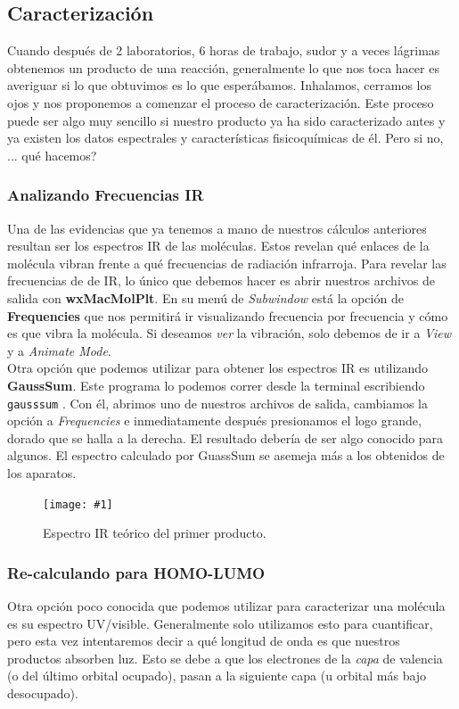 \documentclass[10pt,letterpaper]{article}
\newcommand{\inlinecode}[1]{
\colorbox{light-gray}{\texttt{#1}}
}
\newcommand{\Picture}[3]
{
	\begin{figure}[H]
	\begin{center}
	\caption{#3}
	\texttt{[image: \#1]}
	\end{center}
	\end{figure}
}
\begin{document}
\subsection{Caracterizaci\'on}
Cuando despu\'es de 2 laboratorios, 6 horas de trabajo, sudor y a veces l\'agrimas obtenemos un producto de una reacci\'on, generalmente lo que nos toca hacer es averiguar si lo que obtuvimos es lo que esper\'abamos. Inhalamos, cerramos los ojos y nos proponemos a comenzar el proceso de caracterizaci\'on. Este proceso puede ser algo muy sencillo si nuestro producto ya ha sido caracterizado antes y ya existen los datos espectrales y caracter\'isticas fisicoqu\'imicas de \'el. Pero si no, ... qu\'e hacemos?

\subsubsection{Analizando Frecuencias IR}
Una de las evidencias que ya tenemos a mano de nuestros c\'alculos anteriores resultan ser los espectros IR de las mol\'eculas. Estos revelan qu\'e enlaces de la mol\'ecula vibran frente a qu\'e frecuencias de radiaci\'on infrarroja. Para revelar las frecuencias de de IR, lo \'unico que debemos hacer es abrir nuestros archivos de salida con \textbf{wxMacMolPlt}. En su men\'u de \textit{Subwindow} est\'a la opci\'on de \textbf{Frequencies} que nos permitir\'a ir visualizando frecuencia por frecuencia y c\'omo es que vibra la mol\'ecula. Si deseamos \emph{ver} la vibraci\'on, solo debemos de ir a \textit{View} y a \textit{Animate Mode}.\\

Otra opci\'on que podemos utilizar para obtener los espectros IR es utilizando \textbf{GaussSum}. Este programa lo podemos correr desde la terminal escribiendo \inlinecode{gausssum}. Con \'el, abrimos uno de nuestros archivos de salida, cambiamos la opci\'on a \textit{Frequencies} e inmediatamente despu\'es presionamos el logo grande, dorado que se halla a la derecha. El resultado deber\'ia de ser algo conocido para algunos. El espectro calculado por GuassSum se asemeja m\'as a los obtenidos de los aparatos.

\Picture{img/IR.png}{0.7}{Espectro IR te\'orico del primer producto.}

\subsubsection{Re-calculando para HOMO-LUMO}
Otra opci\'on poco conocida que podemos utilizar para caracterizar una mol\'ecula es su espectro UV/visible. Generalmente solo utilizamos esto para cuantificar, pero esta vez intentaremos decir a qu\'e longitud de onda es que nuestros productos absorben luz. Esto se debe a que los electrones de la \emph{capa} de valencia (o del \'ultimo orbital ocupado), pasan a la siguiente capa (u orbital m\'as bajo desocupado).\\
\end{document}
